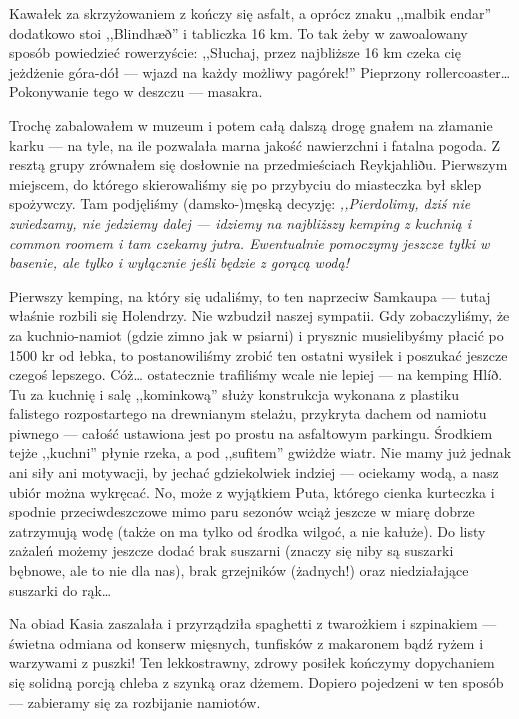 Kawałek za skrzyżowaniem  z  kończy się asfalt, a oprócz znaku ,,malbik endar'' dodatkowo stoi ,,Blindhæð'' i tabliczka 16 km. To tak żeby w zawoalowany sposób powiedzieć rowerzyście: ,,Słuchaj, przez najbliższe 16 km czeka cię jeżdżenie góra-dół --- wjazd na każdy możliwy pagórek!'' Pieprzony rollercoaster… Pokonywanie tego w deszczu --- masakra.


Trochę zabalowałem w muzeum i potem całą dalszą drogę gnałem na złamanie karku --- na tyle, na ile pozwalała marna jakość nawierzchni i fatalna pogoda. Z resztą grupy zrównałem się dosłownie na przedmieściach Reykjahliðu. Pierwszym miejscem, do którego skierowaliśmy się po przybyciu do miasteczka był sklep spożywczy. Tam podjęliśmy (damsko-)męską decyzję: \emph{,,Pierdolimy, dziś nie zwiedzamy, nie jedziemy dalej --- idziemy na najbliższy kemping z kuchnią i common roomem i tam czekamy jutra. Ewentualnie pomoczymy jeszcze tyłki w basenie, ale tylko i wyłącznie jeśli będzie z gorącą wodą!}

Pierwszy kemping, na który się udaliśmy, to ten naprzeciw Samkaupa --- tutaj właśnie rozbili się Holendrzy. Nie wzbudził naszej sympatii. Gdy zobaczyliśmy, że za kuchnio-namiot (gdzie zimno jak w psiarni) i prysznic musielibyśmy płacić po 1500 kr od łebka, to postanowiliśmy zrobić ten ostatni wysiłek i poszukać jeszcze czegoś lepszego. Cóż… ostatecznie trafiliśmy wcale nie lepiej --- na kemping Hlíð. Tu za kuchnię i salę ,,kominkową'' służy konstrukcja wykonana z plastiku falistego rozpostartego na drewnianym stelażu, przykryta dachem od namiotu piwnego --- całość ustawiona jest po prostu na asfaltowym parkingu. Środkiem tejże ,,kuchni'' płynie rzeka, a pod ,,sufitem'' gwiżdże wiatr. Nie mamy już jednak ani siły ani motywacji, by jechać gdziekolwiek indziej --- ociekamy wodą, a nasz ubiór można wykręcać. No, może z wyjątkiem Puta, którego cienka kurteczka i spodnie przeciwdeszczowe mimo paru sezonów wciąż jeszcze w miarę dobrze zatrzymują wodę (także on ma tylko od środka wilgoć, a nie kałuże). Do listy zażaleń możemy jeszcze dodać brak suszarni (znaczy się niby są suszarki bębnowe, ale to nie dla nas), brak grzejników (żadnych!) oraz niedziałające suszarki do rąk…

Na obiad Kasia zaszalała i przyrządziła spaghetti z twarożkiem i szpinakiem --- świetna odmiana od konserw mięsnych, tunfisków z makaronem bądź ryżem i warzywami z puszki! Ten lekkostrawny, zdrowy posiłek kończymy dopychaniem się solidną porcją chleba z szynką oraz dżemem. Dopiero pojedzeni w ten sposób --- zabieramy się za rozbijanie namiotów.

